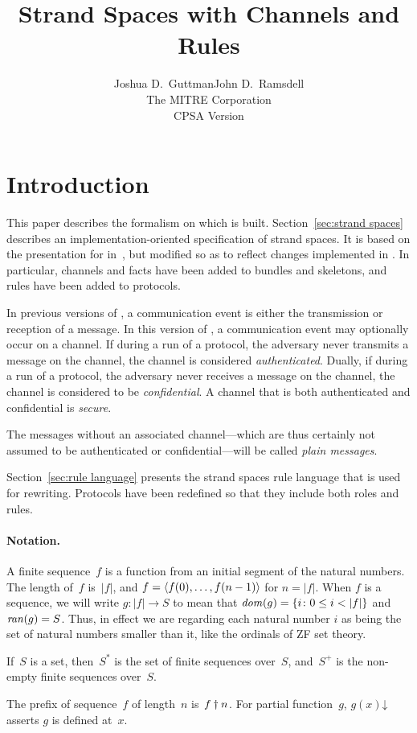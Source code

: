 \documentclass[12pt]{article}
\title{Strand Spaces with Channels and Rules}
\author{Joshua D.\ Guttman\quad John D.\ Ramsdell\\
  The MITRE Corporation\\ CPSA Version \version}
\newcommand{\sdom}{\fn{dom}}
\newcommand{\sran}{\fn{ran}}
\newcommand{\defd}{\mathord\downarrow}
\newcommand{\length}[1]{\ensuremath{|#1|}}
\begin{document}
\maketitle

\section{Introduction}
This paper describes the formalism on which {} is built.
Section~\ref{sec:strand spaces} describes an implementation-oriented
specification of strand spaces.  It is based on the presentation for
{} in~\cite{cpsaspec09}, but modified so as to reflect changes
implemented in {}.  In particular, channels and facts have been
added to bundles and skeletons, and rules have been added to
protocols.

In previous versions of {\cpsa}, a communication event is either the
transmission or reception of a message.  In this version of {\cpsa}, a
communication event may optionally occur on a channel.  If during a
run of a protocol, the adversary never transmits a message on the
channel, the channel is considered \emph{authenticated}.  Dually, if
during a run of a protocol, the adversary never receives a message on
the channel, the channel is considered to be \emph{confidential}.  A
channel that is both authenticated and confidential is \emph{secure}.

The messages without an associated channel---which are thus certainly
not assumed to be authenticated or confidential---will be
called \emph{plain messages}.

Section~\ref{sec:rule language} presents the strand spaces rule
language that is used for rewriting.  Protocols have been redefined
so that they include both roles and rules.

\paragraph{Notation.}

A finite sequence~$f$ is a function from an initial segment of the
natural numbers.  The length of~$f$ is~$\length{f}$, and $f=\langle f(0),\ldots,
  f(n-1)\rangle$ for $n=\length{f}$.  When $f$ is a sequence, we will write
$g\colon\length{f}\rightarrow S$ to mean that $\sdom(g)=\{i\colon0\le
i<\length{f}\}$ and $\sran(g)=S$.  Thus, in effect we are regarding
each natural number $i$ as being the set of natural numbers smaller
than it, like the ordinals of ZF set theory.

If~$S$ is a set, then~$S^\ast$ is the set of finite sequences
over~$S$, and~$S^+$ is the non-empty finite sequences over~$S$.
\iffalse
The concatenation of sequences~$f_0$ and~$f_1$ is~$f_0\append f_1$.
\fi
The prefix of sequence~$f$ of length~$n$ is~$f\dagger n$.
For partial function~$g$, $g(x)\defd$ asserts $g$ is defined at~$x$.
\end{document}
